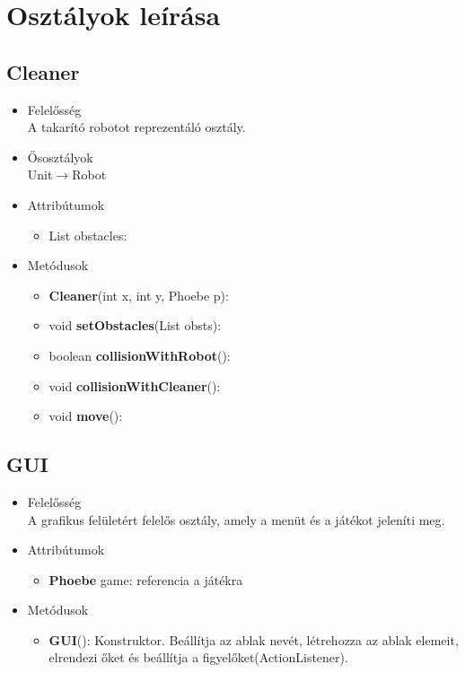 \section{Osztályok leírása}

\subsection{Cleaner}
\begin{itemize}
\item Felelősség\\
A takarító robotot reprezentáló osztály.
\item Ősosztályok\\
Unit$\rightarrow$Robot
\item Attribútumok
    \begin{itemize}
        \item List obstacles:  
    \end{itemize}
\item Metódusok
	\begin{itemize}
	    \item \textbf{Cleaner}(int x, int y, Phoebe p):
		\item void \textbf{setObstacles}(List obsts): 
		\item boolean \textbf{collisionWithRobot}():
		\item void \textbf{collisionWithCleaner}():
		\item void \textbf{move}():
	\end{itemize}
\end{itemize}



\subsection{GUI}
\begin{itemize}
\item Felelősség\\
A grafikus felületért felelős osztály, amely a menüt és a játékot jeleníti meg.
\item Attribútumok
	\begin{itemize}
		\item \textbf{Phoebe} game: referencia a játékra
	\end{itemize}
\item Metódusok
	\begin{itemize}
		\item\textbf{GUI}(): Konstruktor. Beállítja az ablak nevét, létrehozza az ablak elemeit, elrendezi őket és beállítja a figyelőket(ActionListener).
	\end{itemize}
\end{itemize}

